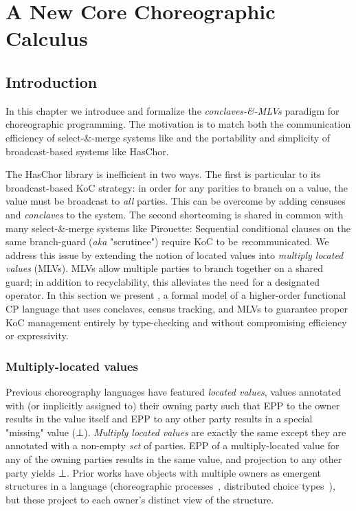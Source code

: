 \chapter{A New Core Choreographic Calculus}
\label{sec:formalism}


\section{Introduction}
In this chapter we introduce and formalize the \emph{conclaves-\&-MLVs} paradigm for choreographic programming.
The motivation is to match both the communication efficiency of select-\&-merge systems like \chorLambda
and the portability and simplicity of broadcast-based systems like HasChor.

The HasChor library is inefficient in two ways.
The first is particular to its broadcast-based KoC strategy:
in order for any parities to branch on a value, the value must be broadcast to \emph{all} parties.
This can be overcome by adding censuses and \emph{conclaves} to the system.
The second shortcoming is shared in common with many select-\&-merge systems like Pirouette:
Sequential conditional clauses on the same branch-guard (\textit{aka} "scrutinee") require KoC to be \emph{re}communicated.
We address this issue by extending the notion of located values into \emph{multiply located values} (MLVs).
MLVs allow multiple parties to branch together on a shared guard;
in addition to recyclability, this alleviates the need for a designated  operator.
In this section we present \HLSCentral,
a formal model of a higher-order functional CP language that uses conclaves, census tracking, and MLVs
to guarantee proper KoC management entirely by type-checking and without compromising efficiency or expressivity.


\subsection{Multiply-located values}
\label{sec:mlvs}

Previous choreography languages have featured \emph{located values},
values annotated with (or implicitly assigned to) their owning party such that EPP to the owner results
in the value itself and EPP to any other party results in a special
"missing" value (\eg ⊥).
\emph{Multiply located values} are exactly the same except they are annotated with a non-empty \emph{set} of parties.
EPP of a multiply-located value for any of the owning parties results in the same value,
and projection to any other party yields ⊥.
Prior works have objects with multiple owners as emergent structures in a language
(\eg choreographic processes~\cite{giallorenzo-choral}, distributed choice types~\cite{chor-lambda-2}),
but these project to each owner's distinct view of the structure.

